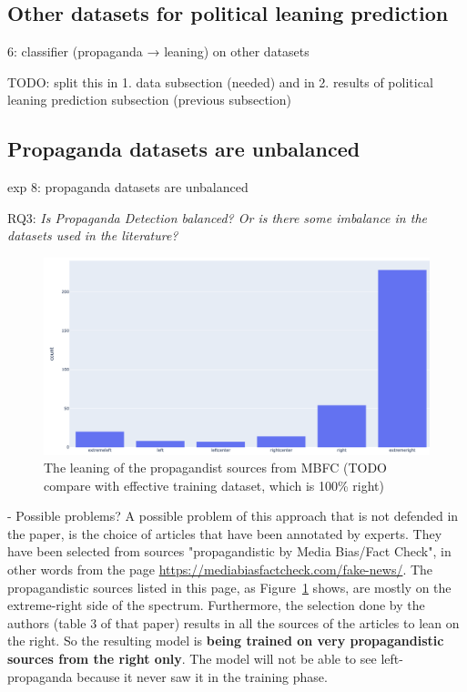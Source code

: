 \subsection{Other datasets for political leaning prediction}
6: classifier (propaganda → leaning) on other datasets

TODO: split this in 
1. data subsection (needed) and in
2. results of political leaning prediction subsection (previous subsection)

\subsection{\statusorange Propaganda datasets are unbalanced}
\label{ssec:ps_prop_leaning_unbalanced}

exp 8: propaganda datasets are unbalanced

RQ3: \emph{Is Propaganda Detection balanced? Or is there some imbalance in the datasets used in the literature?}

\begin{figure}[!htb]
   \centering
   \includegraphics[width=\linewidth]{figures/leaning_questionable.png}
   \caption{The leaning of the propagandist sources from MBFC (TODO compare with effective training dataset, which is 100\% right)}
   \label{fig:mbfc_leaning}
\end{figure}

- Possible problems?
A possible problem of this approach that is not defended in the paper, is the choice of articles that have been annotated by experts. They have been selected from sources "propagandistic by Media Bias/Fact Check", in other words from the page \url{https://mediabiasfactcheck.com/fake-news/}. The propagandistic sources listed in this page, as Figure~\ref{fig:mbfc_leaning} shows, are mostly on the extreme-right side of the spectrum. Furthermore, the selection done by the authors (table 3 of that paper) results in all the sources of the articles to lean on the right.
So the resulting model is \textbf{being trained on very propagandistic sources from the right only}. The model will not be able to see left-propaganda because it never saw it in the training phase.



